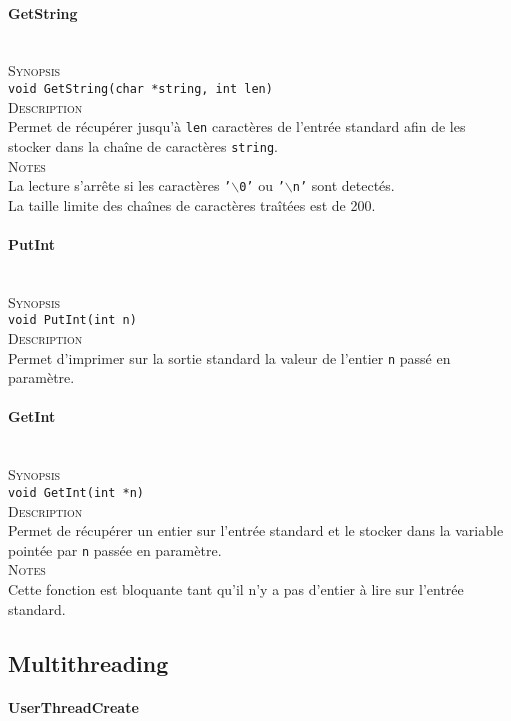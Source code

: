\documentclass{report}
\newcommand{\myparagraph}[1]{\paragraph*{#1}\mbox{}\\}
\begin{document}
\myparagraph{GetString}

\textsc{Synopsis}\\
	\texttt{void GetString(char *string, int len)}\\
	
\textsc{Description}\\
	Permet de récupérer jusqu'à \texttt{len} caractères de l'entrée standard afin de les stocker dans la chaîne de caractères \texttt{string}.\\
	
\textsc{Notes}\\
	La lecture s'arrête si les caractères \texttt{'$\backslash$0'} ou \texttt{'$\backslash$n'} sont detectés.\\
	La taille limite des chaînes de caractères traîtées est de 200.	\\
	
	
	
	
\myparagraph{PutInt}

\textsc{Synopsis}\\
	\texttt{void PutInt(int n)}\\
	
\textsc{Description}\\
	Permet d'imprimer sur la sortie standard la valeur de l'entier \texttt{n} passé en paramètre.\\
	

\myparagraph{GetInt}

\textsc{Synopsis}\\
	\texttt{void GetInt(int *n)}\\
	
\textsc{Description}\\
	Permet de récupérer un entier sur l'entrée standard et le stocker dans la variable pointée par \texttt{n} passée en paramètre.\\
	
\textsc{Notes}\\
	Cette fonction est bloquante tant qu'il n'y a pas d'entier à lire sur l'entrée standard.
	

\subsection*{Multithreading}
\myparagraph{UserThreadCreate}
\end{document}
